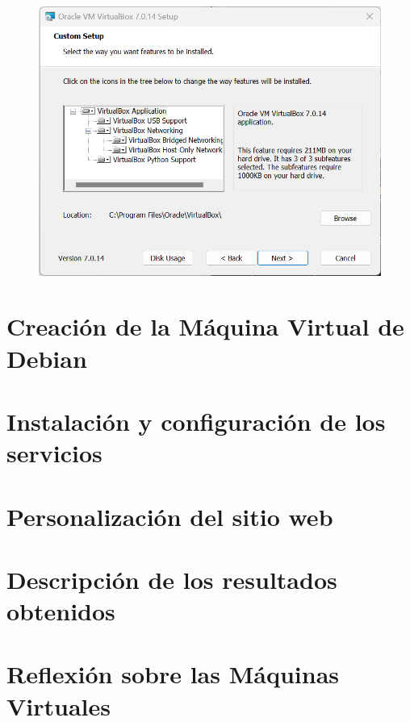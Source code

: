 \documentclass[12pt,a4paper]{article}
\begin{document}
\begin{figure}[H]
    \centering
    \includegraphics[width=1\linewidth]{M3_Virtualización_y_Contenedores/Tarea_2_Máquina_Virtual_Local/reporte/figuras/2-2_Instalación_Oracle_VM.png}
    \label{fig:Instalación_VirtualBox_2}
\end{figure}


\section{Creación de la Máquina Virtual de Debian}


\section{Instalación y configuración de los servicios}


\section{Personalización del sitio web}


\section{Descripción de los resultados obtenidos}


\section{Reflexión sobre las Máquinas Virtuales}


\vspace{1em}
\end{document}
